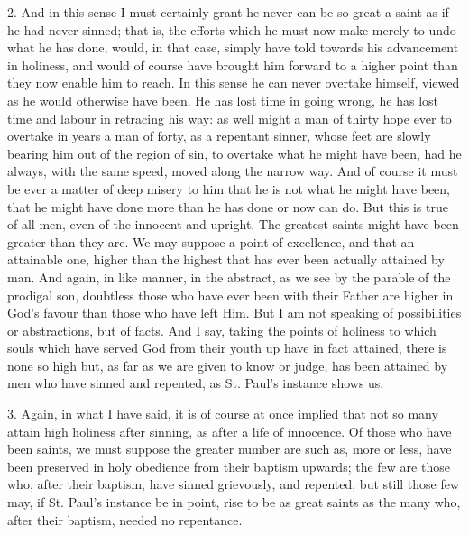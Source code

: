 2. And in this sense I must certainly grant he never can be so
great a saint as if he had never sinned; that is, the efforts which he
must now make merely to undo what he has done, would, in that case,
simply have told towards his advancement in holiness, and would of
course have brought him forward to a higher point than they now enable
him to reach. In this sense he can never overtake himself, viewed as
he would otherwise have been. He has lost time in going wrong, he has
lost time and labour in retracing his way: as well might a man of
thirty hope ever to overtake in years a man of forty, as a repentant
sinner, whose feet are slowly bearing him out of the region of sin, to
overtake what he might have been, had he always, with the same speed,
moved along the narrow way. And of course it must be ever a matter of
deep misery to him that he is not what he might have been, that he
might have done more than he has done or now can do. But this is true
of all men, even of the innocent and upright. The greatest saints
might have been greater than they are. We may suppose a point of
excellence, and that an attainable one, higher than the highest that
has ever been actually attained by man. And again, in like manner, in
the abstract, as we see by the parable of the prodigal son, doubtless
those who have ever been with their Father are higher in God's favour
than those who have left Him. But I am not speaking of possibilities
or abstractions, but of facts. And I say, taking the points of
holiness to which souls which have served God from their youth up have
in fact attained, there is none so high but, as far as we are given to
know or judge, has been attained by men who have sinned and repented,
as St. Paul's instance shows us.

3. Again, in what I have said, it is of course at once implied that
not so many attain high holiness after sinning, as after a life of
innocence. Of those who have been saints, we must suppose the greater
number are such as, more or less, have been preserved in holy obedience from their baptism upwards; the few are those who, after
their baptism, have sinned grievously, and repented, but still those
few may, if St. Paul's instance be in point, rise to be as great
saints as the many who, after their baptism, needed no repentance.

